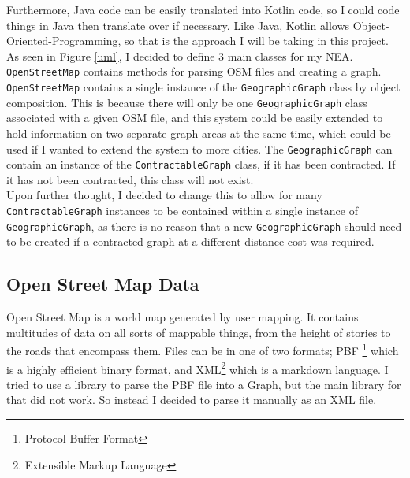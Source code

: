 \documentclass[11pt,twoside,a4paper]{report}
\begin{document}
Furthermore, Java code can be easily translated into Kotlin code, so I could code things in Java then translate over if necessary. Like Java, Kotlin allows Object-Oriented-Programming, so that
is the approach I will be taking in this project.\\
As seen in Figure \ref{uml}, I decided to define 3 main classes for my NEA. \texttt{OpenStreetMap} contains methods for parsing OSM files and creating a graph.
\texttt{OpenStreetMap} contains a single instance of the \texttt{GeographicGraph} class by object composition. This is because there will only be one \texttt{GeographicGraph}
class associated with a given OSM file, and this system could be easily extended to hold information on two separate graph areas at the same time, which could be used if I wanted
to extend the system to more cities. The \texttt{GeographicGraph} can contain an instance of the \texttt{ContractableGraph} class, if it has been contracted. If it has not been contracted,
this class will not exist.\\
Upon further thought, I decided to change this to allow for many \texttt{ContractableGraph} instances to be contained within a single instance of \texttt{GeographicGraph}, as there is no reason that a new \texttt{GeographicGraph} should need to be created
 if a contracted graph at a different distance cost was required. \\
\subsection{Open Street Map Data}
Open Street Map is a world map generated by user mapping. It contains multitudes of data on all sorts of mappable things, from the height of stories to the roads that encompass them.
Files can be in one of two formats; PBF \footnote{Protocol Buffer Format} which is a highly efficient binary format, and XML\footnote{Extensible Markup Language} which is a markdown language. I tried to use a library to parse 
the PBF file into a Graph, but the main library for that did not work. So instead I decided to parse it manually as an XML file.\\
\end{document}
